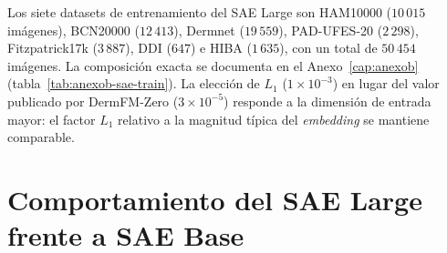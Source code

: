 \begin{table}[H]
\centering
\footnotesize
\setlength{\tabcolsep}{4pt}
\renewcommand{\arraystretch}{0.95}
\caption{Configuración comparada del SAE entrenado en el trabajo
(``SAE Large'') y del SAE publicado por DermFM-Zero
(``SAE Base'').}
\label{tab:anexof-config}
\end{table}

Los siete datasets de entrenamiento del SAE Large son HAM10000
($10\,015$ imágenes), BCN20000 ($12\,413$),
Dermnet ($19\,559$), PAD-UFES-20 ($2\,298$),
Fitzpatrick17k ($3\,887$), DDI ($647$) e HIBA
($1\,635$), con un total de $50\,454$ imágenes. La
composición exacta se documenta en el Anexo~\ref{cap:anexob}
(tabla~\ref{tab:anexob-sae-train}). La elección de
$L_1$ ($1\times 10^{-3}$) en lugar del valor publicado por
DermFM-Zero ($3\times 10^{-5}$) responde a la dimensión de entrada
mayor: el factor $L_1$ relativo a la magnitud típica del
\emph{embedding} se mantiene comparable.

\section{Comportamiento del SAE Large frente a SAE Base}
\label{sec:anexof-comparacion}

